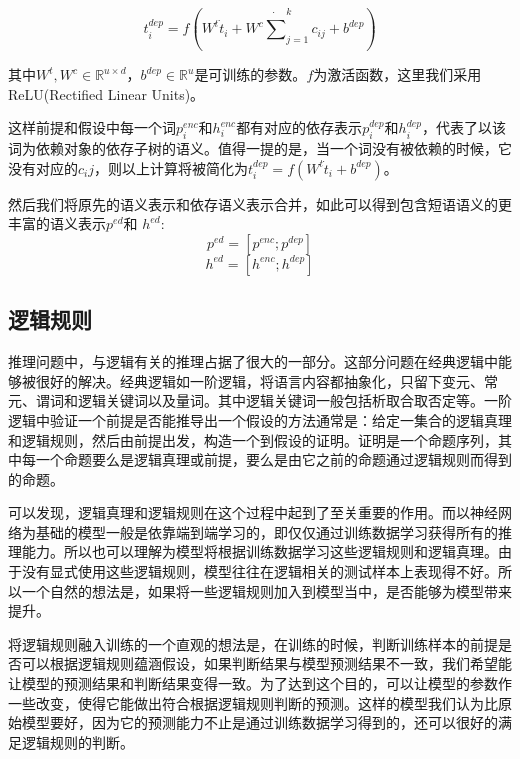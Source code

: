 \documentclass[UTF8,11pt,a4paper,nofonts]{ctexart}
\begin{document}
\begin{equation}
t^{dep}_i = f(W^t \dot t_i + W^c \dot \sum^{k}_{j=1}c_{ij} + b^{dep})
\end{equation}

其中$W^t, W^c \in \mathbb{R}^{u \times d}$，$b^{dep} \in \mathbb{R}^{u}$是可训练的参数。$f$为激活函数，这里我们采用ReLU(Rectified Linear Units)。

这样前提和假设中每一个词$p^{enc}_i$和$h^{enc}_i$都有对应的依存表示$p^{dep}_i$和$h^{dep}_i$，代表了以该词为依赖对象的依存子树的语义。值得一提的是，当一个词没有被依赖的时候，它没有对应的$c_ij$，则以上计算将被简化为$t^{dep}_i = f(W^t \dot t_i + b^{dep})$。

然后我们将原先的语义表示和依存语义表示合并，如此可以得到包含短语语义的更丰富的语义表示$p^{ed}$和 $h^{ed}$:
\begin{equation}
p^{ed} = [p^{enc}; p^{dep}]
\end{equation}
\begin{equation}
h^{ed} = [h^{enc}; h^{dep}]
\end{equation}


\subsection{逻辑规则}


推理问题中，与逻辑有关的推理占据了很大的一部分。这部分问题在经典逻辑中能够被很好的解决。经典逻辑如一阶逻辑，将语言内容都抽象化，只留下变元、常元、谓词和逻辑关键词以及量词。其中逻辑关键词一般包括析取合取否定等。一阶逻辑中验证一个前提是否能推导出一个假设的方法通常是：给定一集合的逻辑真理和逻辑规则，然后由前提出发，构造一个到假设的证明。证明是一个命题序列，其中每一个命题要么是逻辑真理或前提，要么是由它之前的命题通过逻辑规则而得到的命题。

可以发现，逻辑真理和逻辑规则在这个过程中起到了至关重要的作用。而以神经网络为基础的模型一般是依靠端到端学习的，即仅仅通过训练数据学习获得所有的推理能力。所以也可以理解为模型将根据训练数据学习这些逻辑规则和逻辑真理。由于没有显式使用这些逻辑规则，模型往往在逻辑相关的测试样本上表现得不好。所以一个自然的想法是，如果将一些逻辑规则加入到模型当中，是否能够为模型带来提升。



将逻辑规则融入训练的一个直观的想法是，在训练的时候，判断训练样本的前提是否可以根据逻辑规则蕴涵假设，如果判断结果与模型预测结果不一致，我们希望能让模型的预测结果和判断结果变得一致。为了达到这个目的，可以让模型的参数作一些改变，使得它能做出符合根据逻辑规则判断的预测。这样的模型我们认为比原始模型要好，因为它的预测能力不止是通过训练数据学习得到的，还可以很好的满足逻辑规则的判断。
\end{document}
